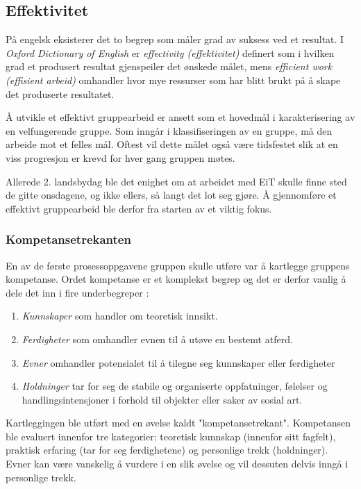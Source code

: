 \subsection{Effektivitet}
På engelsk eksisterer det to begrep som måler grad av suksess ved et resultat. 
I \textit{Oxford Dictionary of English} er \textit{effectivity (effektivitet)} definert som i hvilken grad et produsert resultat gjenspeiler det ønskede målet, mens \textit{efficient work (effisient arbeid)} omhandler hvor mye ressurser som har blitt brukt på å skape det produserte resultatet. 

Å utvikle et effektivt gruppearbeid er ansett som et hovedmål i karakterisering av en velfungerende gruppe. 
Som inngår i klassifiseringen av en gruppe, må den arbeide mot et felles mål. 
Oftest vil dette målet også være tidsfestet slik at en viss progresjon er krevd for hver gang gruppen møtes.

Allerede 2. landsbydag ble det enighet om at arbeidet med EiT skulle finne sted de gitte onsdagene, og ikke ellers, så langt det lot seg gjøre. 
Å gjennomføre et effektivt gruppearbeid ble derfor fra starten av et viktig fokus. 

\subsubsection{Kompetansetrekanten}
En av de første prosessoppgavene gruppen skulle utføre var å kartlegge gruppens kompetanse.
Ordet kompetanse er et komplekst begrep og det er derfor vanlig å dele det inn i fire underbegreper \cite{orgorg}:
\begin{enumerate}
\item \textit{Kunnskaper} som handler om teoretisk innsikt.
\item \textit{Ferdigheter} som omhandler evnen til å utøve en bestemt atferd.
\item \textit{Evner} omhandler potensialet til å tilegne seg kunnskaper eller ferdigheter
\item \textit{Holdninger} tar for seg de stabile og organiserte oppfatninger, følelser og handlingsintensjoner i forhold til objekter eller saker av sosial art.
\end{enumerate}
Kartleggingen ble utført med en øvelse kaldt "kompetansetrekant".
Kompetansen ble evaluert innenfor tre kategorier: teoretisk kunnskap (innenfor sitt fagfelt), praktisk erfaring (tar for seg ferdighetene) og personlige trekk (holdninger).
Evner kan være vanskelig å vurdere i en slik øvelse og vil dessuten delvis inngå i personlige trekk.

